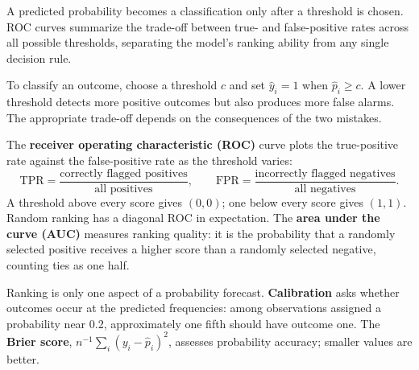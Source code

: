 \documentclass[
  11pt,
]{book}
\theoremstyle{definition}
\theoremstyle{definition}
\theoremstyle{definition}
\theoremstyle{definition}
\theoremstyle{remark}
\begin{document}
A predicted probability becomes a classification only after a threshold is chosen. ROC curves summarize the trade-off between true- and false-positive rates across all possible thresholds, separating the model's ranking ability from any single decision rule.

To classify an outcome, choose a threshold \(c\) and set \(\widehat y_i=1\) when \(\widehat p_i\geq c\). A lower threshold detects more positive outcomes but also produces more false alarms. The appropriate trade-off depends on the consequences of the two mistakes.

The \textbf{receiver operating characteristic (ROC)} curve plots the true-positive rate against the false-positive rate as the threshold varies:
\[
\mathrm{TPR}=\frac{\text{correctly flagged positives}}{\text{all positives}},
\qquad
\mathrm{FPR}=\frac{\text{incorrectly flagged negatives}}{\text{all negatives}}.
\]
A threshold above every score gives \((0,0)\); one below every score gives \((1,1)\). Random ranking has a diagonal ROC in expectation. The \textbf{area under the curve (AUC)} measures ranking quality: it is the probability that a randomly selected positive receives a higher score than a randomly selected negative, counting ties as one half.

Ranking is only one aspect of a probability forecast. \textbf{Calibration} asks whether outcomes occur at the predicted frequencies: among observations assigned a probability near 0.2, approximately one fifth should have outcome one. The \textbf{Brier score}, \(n^{-1}\sum_i(y_i-\widehat p_i)^2\), assesses probability accuracy; smaller values are better.
\end{document}
